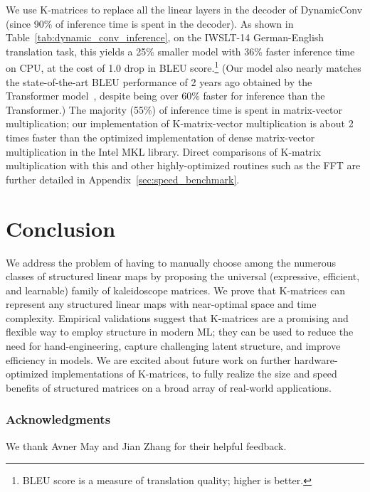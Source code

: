 We use K-matrices to replace all the linear layers in the decoder of DynamicConv (since 90\% of inference time is spent in the decoder). As shown in Table~\ref{tab:dynamic_conv_inference}, on the IWSLT-14 German-English translation task, this yields a 25\% smaller model with 36\%
faster inference time on CPU, at the cost of 1.0 drop in BLEU
score.\footnote{BLEU score is a measure of translation quality; higher is better.} (Our model also nearly matches the state-of-the-art BLEU performance of 2 years ago obtained by the Transformer model~\citep{vaswani2017attention}, despite being over 60\% faster for inference than the Transformer.) The majority (55\%) of inference time is spent in matrix-vector multiplication; our implementation of K-matrix-vector multiplication is about 2 times faster than the optimized implementation of dense matrix-vector multiplication in the Intel MKL library. Direct comparisons of K-matrix multiplication with this and other highly-optimized routines such as the FFT are further detailed in Appendix~\ref{sec:speed_benchmark}.

\section{Conclusion}
\label{sec:conclusion}

We address the problem of having to manually choose among the numerous classes of structured linear maps by proposing the universal (expressive, efficient, and learnable) family of kaleidoscope matrices. We prove that K-matrices can represent any structured linear maps with near-optimal space and time complexity. Empirical validations suggest that K-matrices are a promising and flexible way to employ structure in modern ML; they can be used to reduce the need for hand-engineering, capture challenging latent structure, and improve efficiency in models. We are excited about future work on further hardware-optimized implementations of K-matrices, to fully realize the size and speed benefits of structured matrices on a broad array of real-world applications.

\subsubsection*{Acknowledgments}

We thank Avner May and Jian Zhang for their helpful feedback.

